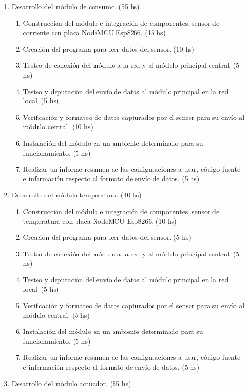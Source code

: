\documentclass[11pt]{charter}
\begin{document}
\begin{enumerate}
\item Desarrollo del módulo de consumo. (55 hs)
	\begin{enumerate}
	\item Construcción del módulo e integración de componentes, sensor de corriente con placa NodeMCU Esp8266. (15 hs)
	\item Creación del programa para leer datos del sensor. (10 hs)
	\item Testeo de conexión del módulo a la red y al módulo principal central. (5 hs)
	\item Testeo y depuración del envío de datos al módulo principal en la red local. (5 hs)
	\item Verificación y formateo de datos capturados por el sensor para su envío al módulo central. (10 hs)
	\item Instalación del módulo en un ambiente determinado para su funcionamiento. (5 hs)
	\item Realizar un informe resumen de las configuraciones a usar, código fuente e información respecto al formato de envío de datos. (5 hs)
	\end{enumerate}
\item Desarrollo del módulo temperatura. (40 hs)
	\begin{enumerate}
	\item Construcción del módulo e integración de componentes, sensor de temperatura con placa NodeMCU Esp8266. (10 hs)
	\item Creación del programa para leer datos del sensor. (5 hs)
	\item Testeo de conexión del módulo a la red y al módulo principal central. (5 hs)
	\item Testeo y depuración del envío de datos al módulo principal en la red local. (5 hs)
	\item Verificación y formateo de datos capturados por el sensor para su envío al módulo central. (5 hs)
	\item Instalación del módulo en un ambiente determinado para su funcionamiento. (5 hs)
	\item Realizar un informe resumen de las configuraciones a usar, código fuente e información respecto al formato de envío de datos. (5 hs)
	\end{enumerate}
\item Desarrollo del módulo actuador. (55 hs)

\end{enumerate}
\end{document}
